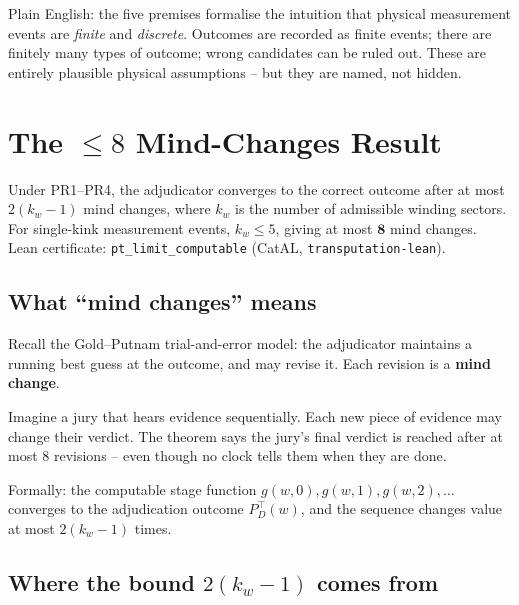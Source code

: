 \documentclass[11pt,a4paper]{article}
\newcommand{\term}[1]{\textbf{#1}}
\newcommand{\lean}[1]{\texttt{#1}}
\newcommand{\Ptop}{P^{\!\top}}
\begin{document}
\noindent
Plain English: the five premises formalise the intuition that physical
measurement events are \emph{finite} and \emph{discrete}. Outcomes are
recorded as finite events; there are finitely many types of outcome;
wrong candidates can be ruled out. These are entirely plausible physical
assumptions -- but they are named, not hidden.

\section{The $\leq 8$ Mind-Changes Result}
\label{sec:mindchanges}

\begin{tcolorbox}[colback=boxblue,colframe=blue!40!black,
  title={The Bounded Mind-Changes Theorem (P51, Theorem 6.3)}]
Under PR1--PR4, the adjudicator converges to the correct outcome after
at most $2(k_w - 1)$ mind changes, where $k_w$ is the number of
admissible winding sectors.  For single-kink measurement events,
$k_w \leq 5$, giving at most $\mathbf{8}$ mind changes.\\[4pt]
Lean certificate: \lean{pt\_limit\_computable} (CatAL, \texttt{transputation-lean}).
\end{tcolorbox}

\subsection{What ``mind changes'' means}

Recall the Gold--Putnam trial-and-error model: the adjudicator maintains a
running best guess at the outcome, and may revise it.  Each revision is a
\term{mind change}.

Imagine a jury that hears evidence sequentially.  Each new piece of
evidence may change their verdict.  The theorem says the jury's final
verdict is reached after at most 8 revisions -- even though no clock tells
them when they are done.

Formally: the computable stage function $g(w, 0), g(w, 1), g(w, 2), \ldots$
converges to the adjudication outcome $\Ptop_D(w)$, and the sequence
changes value at most $2(k_w - 1)$ times.

\subsection{Where the bound $2(k_w - 1)$ comes from}
\end{document}
